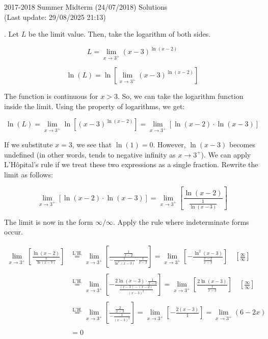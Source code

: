 \documentclass{article}
\begin{document}
\hfill

\newpage

\begin{center}
2017-2018 Summer Midterm (24/07/2018) Solutions\\
(Last update: 29/08/2025 21:13)
\end{center}

. Let $L$ be the limit value. Then, take the logarithm of both sides.

\[L = \lim_{x\to3^+}(x-3)^{\ln(x-2)}\]

\[\ln(L) = \ln\left[\lim_{x\to3^+}(x-3)^{\ln(x-2)}\right]\]

\hfill

\noindent The function is continuous for $x > 3$. So, we can take the logarithm function inside the limit. Using the property of logarithms, we get:

\[\ln(L) = \lim_{x\to3^+}\ln\left[(x-3)^{\ln(x-2)}\right] = \lim_{x\to3^+}\left[\ln(x-2)\cdot \ln(x-3)\right]\]

\hfill

\noindent If we substitute $x=3$, we see that $\ln(1) = 0$. However, $\ln(x-3)$ becomes undefined (in other words, tends to negative infinity as $x\to3^+$). We can apply L'Hôpital's rule if we treat these two expressions as a single fraction. Rewrite the limit as follows:

\[\lim_{x\to3^+}\left[\ln(x-2) \cdot \ln(x-3)\right] =\lim_{x\to3^+}\left[\frac{\ln(x-2)}{\frac{1}{\ln(x-3)}}\right]  \]

\hfill

\noindent The limit is now in the form $\infty/\infty$. Apply the rule where indeterminate forms occur.

\begin{align*}
    \lim_{x\to3^+}\left[\frac{\ln(x-2)}{\frac{1}{\ln(x-3)}}\right] &\overset{\text{L'H.}}{=} \lim_{x\to3^+} \left[\frac{\frac{1}{x-2}}{-\frac{1}{\ln^2(x-3)}\cdot {\frac{1}{x-3}}}\right] = \lim_{x\to3^+} \left[-\frac{\ln^2(x-3)}{\frac{x-2}{x-3}}\right] \quad \left[\frac{\infty}{\infty}\right] \\\\
    &\overset{\text{L'H.}}{=} \lim_{x\to3^+}\left[-\frac{2\ln(x-3)\cdot\frac{1}{x-3}}{\frac{(x-3) -(x-2)}{(x-3)^2}}\right] = \lim_{x\to3^+} \left[\frac{2\ln(x-3)}{\frac{1}{x-3}}\right] \quad \left[\frac{\infty}{\infty}\right] \\\\
    &\overset{\text{L'H.}}{=} \lim_{x\to3^+} \left[\frac{\frac{2}{x-3}}{-\frac{1}{(x-3)^2}}\right] = \lim_{x\to3^+} \left[-\frac{2(x-3)}{1}\right]=\lim_{x\to3^+} (6-2x)\\\\&=0
\end{align*}
\end{document}
